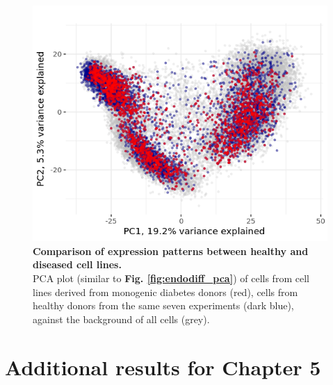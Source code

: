 \begin{figure}[h]
    \centering
    \includegraphics[width=15cm]{Appendix2/Fig/suppl_diabetes_lines.png}
    \caption[PCA of healthy and diseased cell lines]{\textbf{Comparison of expression patterns between healthy and diseased cell lines.}\\
    PCA plot (similar to \textbf{Fig. \ref{fig:endodiff_pca}}) of cells from cell lines derived from monogenic diabetes donors (red), cells from healthy donors from the same seven experiments (dark blue), against the background of all cells (grey). }
    \label{suppl_fig:pca_diabetes_lines}
\end{figure}

\clearpage

\section{Additional results for Chapter 5}

